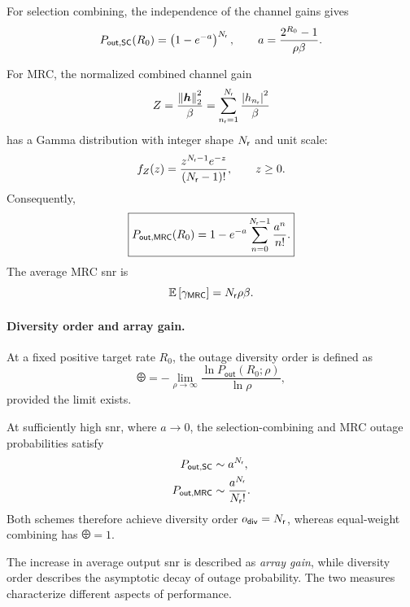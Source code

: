 For selection combining, the independence of the channel gains gives
\begin{equation}\label{eq:scout}
	P_{\mathsf{out},\mathsf{SC}}(R_0)
	=\left(1-e^{-a}\right)^{N_{\mathsf{r}}},
	\qquad
	a=\frac{2^{R_0}-1}{\rho\beta}.
\end{equation}

For MRC, the normalized combined channel gain
\begin{equation*}
	Z=\frac{\left\|\bm{h}\right\|_2^2}{\beta}
	=\sum_{n_{\mathsf{r}}=1}^{N_{\mathsf{r}}}\frac{\left|h_{n_{\mathsf{r}}}\right|^2}{\beta}
\end{equation*}
has a Gamma distribution with integer shape $N_{\mathsf{r}}$ and unit scale:
\begin{equation*}
	f_Z(z)
	=\frac{z^{N_{\mathsf{r}}-1}e^{-z}}{(N_{\mathsf{r}}-1)!},
	\qquad z\geq0.
\end{equation*}
Consequently,
\begin{equation}\label{eq:gammaout}
	\boxed{
		P_{\mathsf{out},\mathsf{MRC}}(R_0)
		=1-e^{-a}\sum_{n=0}^{N_{\mathsf{r}}-1}
		\frac{a^n}{n!}.
	}
\end{equation}
The average MRC \ac{snr} is
\begin{equation*}
	\mathbb{E}\left[\gamma_{\mathsf{MRC}}\right]=N_{\mathsf{r}}\rho\beta.
\end{equation*}

\paragraph{Diversity order and array gain.}
At a fixed positive target rate $R_0$, the outage diversity order is defined as
\begin{equation}\label{eq:diversityorder}
	\boxed{
		\odiv
		=-\lim_{\rho\to\infty}
		\frac{\ln P_{\mathsf{out}}(R_0;\rho)}
		{\ln\rho},
	}
\end{equation}
provided the limit exists.

At sufficiently high \ac{snr}, where $a\to0$, the selection-combining and MRC outage probabilities satisfy
\begin{align*}
	P_{\mathsf{out},\mathsf{SC}}
	&\sim a^{N_{\mathsf{r}}},\\
	P_{\mathsf{out},\mathsf{MRC}}
	&\sim\frac{a^{N_{\mathsf{r}}}}{N_{\mathsf{r}}!}.
\end{align*}
Both schemes therefore achieve diversity order $o_{\mathsf{div}}=N_{\mathsf{r}}$, whereas equal-weight combining has $\odiv=1$.

The increase in average output \ac{snr} is described as \emph{array gain}, while diversity order describes the asymptotic decay of outage probability. The two measures characterize different aspects of performance.

